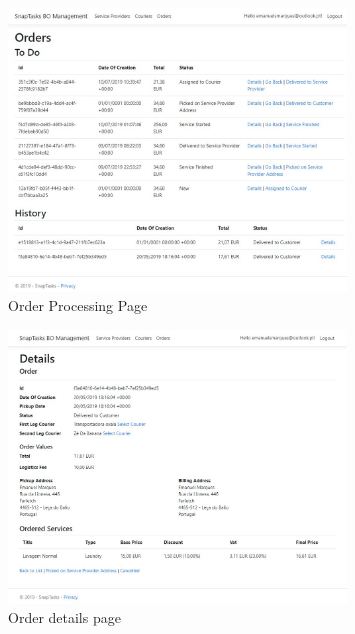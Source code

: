 \begin{figure}[!ht]
\centering
\includegraphics[width=0.8\textwidth,keepaspectratio]{chapters/Implementation/assets/snaptasks-bo-todo.jpg}
\caption[Order Processing Page]{Order Processing Page}
\label{fig:snaptasksOrderList}
\end{figure}

\begin{figure}[!ht]
\centering
\includegraphics[width=0.8\textwidth,keepaspectratio]{chapters/Implementation/assets/snaptasks-bo-orderDetails.jpg}
\caption[Order details page]{Order details page}
\label{fig:snaptasksOrderDetailsBO}
\end{figure}


